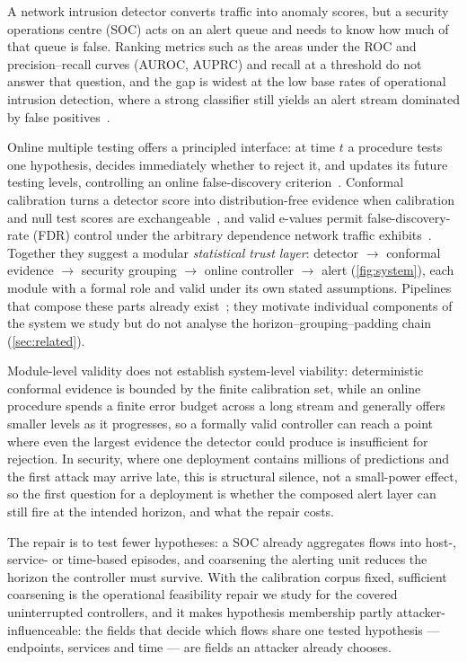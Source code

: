 \documentclass[conference]{IEEEtran}
\begin{document}
A network intrusion detector converts traffic into anomaly scores, but a security operations centre
(SOC) acts on an alert queue and needs to know how much of that queue is false. Ranking metrics such as the areas under the ROC and precision--recall curves (AUROC, AUPRC) and
recall at a threshold do not answer that question, and
the gap is widest at the low base rates of operational intrusion detection, where a strong classifier
still yields an alert stream dominated by false positives~\cite{axelsson1999baserate,axelsson2000baserate}.

Online multiple testing offers a principled interface: at time $t$ a procedure tests one hypothesis,
decides immediately whether to reject it, and updates its future testing levels, controlling an online
false-discovery criterion~\cite{javanmard2015lond,ramdas2017lordpp,xu2024elond}. Conformal calibration
turns a detector score into distribution-free evidence when calibration and null test scores are
exchangeable~\cite{vovk2005alrw,bates2023outliers}, and valid e-values permit false-discovery-rate (FDR)
control under the arbitrary dependence network traffic exhibits~\cite{vovk2021evalues,wang2022evaluebh}. Together they suggest a
modular \emph{statistical trust layer}: detector $\to$ conformal evidence $\to$ security grouping $\to$
online controller $\to$ alert (\cref{fig:system}), each module with a formal role and valid under its
own stated assumptions. Pipelines that compose these parts already
exist~\cite{rebjock2021online,farzaneh2025coad,wang2025multilayer,caliburn2026,gao2026boundary}; they
motivate individual components of the system we study but do not analyse the
horizon--grouping--padding chain (\cref{sec:related}).

Module-level validity does not establish system-level viability: deterministic conformal evidence is
bounded by the finite calibration set, while an online procedure spends a finite error budget across a
long stream and generally offers smaller levels as it progresses, so a formally valid controller can
reach a point where even the largest evidence the detector could produce is insufficient for rejection. In security, where one deployment contains millions of predictions and the
first attack may arrive late, this is structural silence, not a small-power effect, so the first question
for a deployment is whether the composed alert layer can still fire at the intended horizon, and what
the repair costs.

The repair is to test fewer hypotheses: a SOC already aggregates flows into host-, service- or
time-based episodes, and coarsening the alerting unit reduces the horizon the controller must survive.
With the calibration corpus fixed, sufficient coarsening is the operational feasibility repair
we study for the covered uninterrupted controllers, and it makes hypothesis membership partly
attacker-influenceable: the fields that decide which flows share one tested
hypothesis --- endpoints, services and time --- are fields an attacker already chooses.
\end{document}
